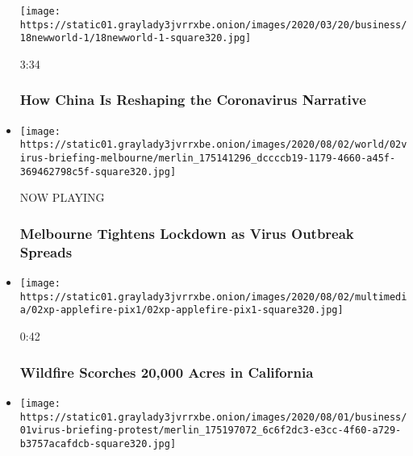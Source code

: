 \begin{itemize}
  \texttt{[image: https://static01.graylady3jvrrxbe.onion/images/2020/03/20/business/18newworld-1/18newworld-1-square320.jpg]}

  3:34

  \hypertarget{how-china-is-reshaping-the-coronavirus-narrative}{%
  \subsubsection{How China Is Reshaping the Coronavirus
  Narrative}\label{how-china-is-reshaping-the-coronavirus-narrative}}
\item
  \texttt{[image: https://static01.graylady3jvrrxbe.onion/images/2020/08/02/world/02virus-briefing-melbourne/merlin\_175141296\_dccccb19-1179-4660-a45f-369462798c5f-square320.jpg]}

  NOW PLAYING

  \hypertarget{melbourne-tightens-lockdown-as-virus-outbreak-spreads-2}{%
  \subsubsection{Melbourne Tightens Lockdown as Virus Outbreak
  Spreads}\label{melbourne-tightens-lockdown-as-virus-outbreak-spreads-2}}
\item
  \href{https://www.nytimes3xbfgragh.onion/video/us/100000007268937/wildfire-scorches-15000-acres-in-california.html?action=click\&module=video-series-bar\&region=header\&pgtype=Article\&playlistId=video/coronavirus-news-update}{}

  \texttt{[image: https://static01.graylady3jvrrxbe.onion/images/2020/08/02/multimedia/02xp-applefire-pix1/02xp-applefire-pix1-square320.jpg]}

  0:42

  \hypertarget{wildfire-scorches-20000-acres-in-california}{%
  \subsubsection{Wildfire Scorches 20,000 Acres in
  California}\label{wildfire-scorches-20000-acres-in-california}}
\item
  \href{https://www.nytimes3xbfgragh.onion/video/world/europe/100000007268465/coronavirus-protest-germany.html?action=click\&module=video-series-bar\&region=header\&pgtype=Article\&playlistId=video/coronavirus-news-update}{}

  \texttt{[image: https://static01.graylady3jvrrxbe.onion/images/2020/08/01/business/01virus-briefing-protest/merlin\_175197072\_6c6f2dc3-e3cc-4f60-a729-b3757acafdcb-square320.jpg]}


\end{itemize}
